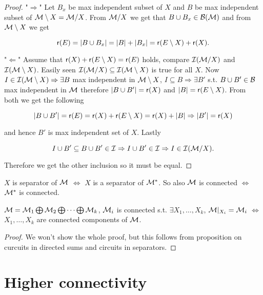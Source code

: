 \begin{proof}
	"$\Rightarrow$" Let $B_{x}$ be max independent subset of $X$ and $B$ be max independent subset of $\mathcal{M} \setminus X = \mathcal{M} / X$. From $\mathcal{M} / X$ we get that $B \cup B_{x} \in \mathcal{B}(\mathcal{M})$ and from $\mathcal{M} \setminus X$ we get

	$$
	\operatorname{\mathsf{r}}(E) = |B \cup B_{x}| = |B| + |B_{x}| = \operatorname{\mathsf{r}}(E \setminus X) + \operatorname{\mathsf{r}}(X).
	$$

	"$\Leftarrow$" Assume that $\operatorname{\mathsf{r}}(X) + \operatorname{\mathsf{r}}(E \setminus X) = \operatorname{\mathsf{r}}(E)$ holds, compare $\mathcal{I}(\mathcal{M} / X)$ and $\mathcal{I}(\mathcal{M} \setminus X)$. Easily seen $\mathcal{I}(\mathcal{M} / X) \subseteq \mathcal{I}(\mathcal{M} \setminus X)$ is true for all $X$. Now $I \in \mathcal{I}(\mathcal{M} \setminus X) \Rightarrow \exists B$ max independent in $\mathcal{M} \setminus X$, $I \subseteq B \Rightarrow \exists B'$ s.t. $B \cup B' \in \mathcal{B}$ max independent in $\mathcal{M}$ therefore $|B \cup B'| = \operatorname{\mathsf{r}}(X)$ and $|B| = \operatorname{\mathsf{r}}(E \setminus X)$. From both we get the following

	$$
	|B \cup B'| = \operatorname{\mathsf{r}}(E) = \operatorname{\mathsf{r}}(X) + \operatorname{\mathsf{r}}(E \setminus X) = \operatorname{\mathsf{r}}(X) + |B| \Rightarrow |B'| = \operatorname{\mathsf{r}}(X)
	$$

	\noindent and hence $B'$ is max independent set of $X$. Lastly

	$$
	I \cup B' \subseteq B \cup B' \in \mathcal{I} \Rightarrow I \cup B' \in \mathcal{I} \Rightarrow I \in \mathcal{I}(\mathcal{M} / X).
	$$

	\noindent Therefore we get the other inclusion so it must be equal.
\end{proof}

\begin{cor}
	$X$ is separator of $\mathcal{M}$ $\iff$ $X$ is a separator of $\mathcal{M}^{\ast}$. So also $\mathcal{M}$ is connected $\iff$ $\mathcal{M}^{\ast}$ is connected.
\end{cor}

\begin{thm}
	$\mathcal{M} = \mathcal{M}_{1} \bigoplus \mathcal{M}_{2} \bigoplus \dots \bigoplus \mathcal{M}_{k}$, $\mathcal{M}_{i}$ is connected s.t. $\exists X_{1}, \dots, X_{k}$, $\mathcal{M} |_{X_{i}} = \mathcal{M}_{i}$ $\iff$ $X_{1}, \dots, X_{k}$ are connected components of $\mathcal{M}$.
\end{thm}

\begin{proof}
	We won't show the whole proof, but this follows from proposition on curcuits in directed sums and circuits in separators.
\end{proof}

\section{Higher connectivity}

